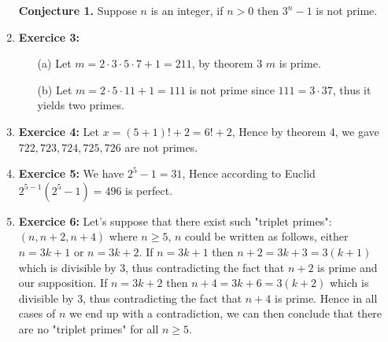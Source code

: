 \documentclass{article} %
\begin{document}
\begin{enumerate}
        \textbf{Conjecture 1.} Suppose \(n\) is an integer, if \(n > 0\) then \(3^{n} - 1\) is not prime.

        \item \textbf{Exercice 3:}
        \begin{itemize}
            \item[(a)] Let \(m = 2 \cdot  3 \cdot 5 \cdot 7 + 1 = 211\), by theorem 3 \(m\) is prime.
            \item[(b)] Let \(m = 2 \cdot 5 \cdot 11 + 1 = 111\) is not prime since \(111 = 3 \cdot 37\), thus it yields two primes.
        \end{itemize}

        \item \textbf{Exercice 4:}
        Let \(x = (5 + 1)! + 2 = 6! + 2\), Hence by theorem 4, we gave \(722, 723, 724, 725, 726\) are not primes.
        
        \item \textbf{Exercice 5:}
        We have \(2^{5} - 1 = 31\), Hence according to Euclid \(2^{5 - 1}(2^{5} - 1) = 496\) is perfect.

        \item \textbf{Exercice 6:}
        Let's suppose that there exist such "triplet primes": \((n, n + 2, n + 4)\) where \(n \geq 5\), \(n\) could be written as follows, either \(n = 3k + 1\) or \(n = 3k + 2\). If \(n = 3k + 1\) then \(n + 2 = 3k + 3 = 3(k + 1)\) which is divisible by 3, thus contradicting the fact that \(n + 2\) is prime and our supposition. If \(n = 3k + 2\) then \(n + 4 = 3k + 6 = 3(k + 2)\) which is divisible by 3, thus contradicting the fact that \(n + 4\) is prime. Hence in all cases of \(n\) we end up with a contradiction, we can then conclude that there are no "triplet primes" for all \(n \geq 5\).


    \end{enumerate}
    
\end{document}
